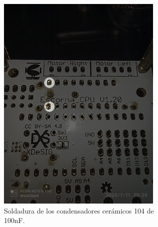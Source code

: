 \documentclass{article}
\begin{document}
\begin{figure}[H]
\begin{subfigure}[t]{0.3\textwidth}
        \includegraphics[width=0.9\columnwidth, height=1.2\columnwidth]{images/CPU/cpu_zocalo_2.png}
        \caption{Soldadura de los condensadores cerámicos 104 de 100nF.}
        \label{fig:cpu_zocalo_2}
    \end{subfigure}%
    \begin{subfigure}[t]{0.3\textwidth}
        \centering

\end{subfigure}
\end{figure}
\end{document}
